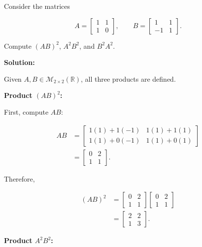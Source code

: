 \item Consider the matrices

$$
A = \begin{bmatrix}
    1 & 1 \\
    1 & 0
\end{bmatrix},
\qquad
B = \begin{bmatrix}
    1 & 1 \\
    -1 & 1
\end{bmatrix}.
$$

Compute $(AB)^2$, $A^2B^2$, and $B^2A^2$.

\textbf{Solution:}

\begin{answer}
    Given $A,B \in \mathcal{M}_{2\times2}(\mathbb{R})$,
    all three products are defined.

    \textbf{Product $(AB)^2$:}

    First, compute $AB$:

    $$
    \begin{aligned}
        AB
        &= \begin{bmatrix}
            1(1)+1(-1) & 1(1)+1(1) \\
            1(1)+0(-1) & 1(1)+0(1)
        \end{bmatrix} \\[0.5em]
        &= \begin{bmatrix}
            0 & 2 \\
            1 & 1
        \end{bmatrix}.
    \end{aligned}
    $$

    Therefore,

    $$
    \begin{aligned}
        (AB)^2
        &= \begin{bmatrix}
            0 & 2 \\
            1 & 1
        \end{bmatrix}
        \begin{bmatrix}
            0 & 2 \\
            1 & 1
        \end{bmatrix} \\[0.5em]
        &= \boxed{\begin{bmatrix}
            2 & 2 \\
            1 & 3
        \end{bmatrix}}.
    \end{aligned}
    $$

    \textbf{Product $A^2B^2$:}


\end{answer}
